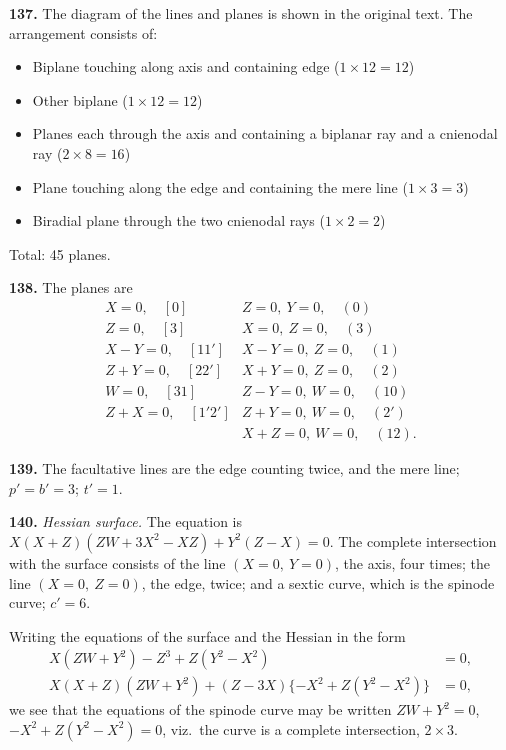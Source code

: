 \documentclass[11pt,a4paper]{article}
\theoremstyle{definition}
\begin{document}
\noindent\textbf{137.} The diagram of the lines and planes is shown in the original text. The arrangement consists of:
\begin{itemize}[noitemsep]
\item Biplane touching along axis and containing edge ($1\times 12=12$)
\item Other biplane ($1\times 12=12$)
\item Planes each through the axis and containing a biplanar ray and a cnienodal ray ($2\times 8=16$)
\item Plane touching along the edge and containing the mere line ($1\times 3=3$)
\item Biradial plane through the two cnienodal rays ($1\times 2=2$)
\end{itemize}
Total: 45 planes.

\setcounter{page}{427}

\noindent\textbf{138.} The planes are
\[
\begin{array}{ll}
X=0, \quad [0] & Z=0,\ Y=0, \quad (0) \\
Z=0, \quad [3] & X=0,\ Z=0, \quad (3) \\
X-Y=0, \quad [11'] & X-Y=0,\ Z=0, \quad (1) \\
Z+Y=0, \quad [22'] & X+Y=0,\ Z=0, \quad (2) \\
W=0, \quad [31] & Z-Y=0,\ W=0, \quad (10) \\
Z+X=0, \quad [1'2'] & Z+Y=0,\ W=0, \quad (2') \\
& X+Z=0,\ W=0, \quad (12).
\end{array}
\]

\noindent\textbf{139.} The facultative lines are the edge counting twice, and the mere line; $p'=b'=3$; $t'=1$.

\noindent\textbf{140.} \textit{Hessian surface.} The equation is $X(X+Z)(ZW+3X^2-XZ)+Y^2(Z-X)=0$. The complete intersection with the surface consists of the line $(X=0,\ Y=0)$, the axis, four times; the line $(X=0,\ Z=0)$, the edge, twice; and a sextic curve, which is the spinode curve; $c'=6$.

Writing the equations of the surface and the Hessian in the form
\begin{align*}
X(ZW+Y^2)-Z^3+Z(Y^2-X^2) &= 0,\\
X(X+Z)(ZW+Y^2)+(Z-3X)\{-X^2+Z(Y^2-X^2)\} &= 0,
\end{align*}
we see that the equations of the spinode curve may be written $ZW+Y^2=0$, $-X^2+Z(Y^2-X^2)=0$, viz.\ the curve is a complete intersection, $2\times 3$.
\end{document}
